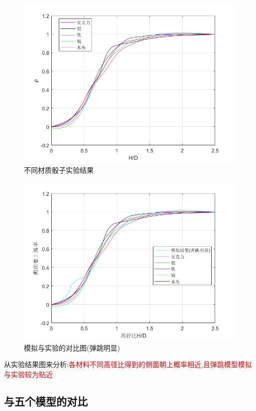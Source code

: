 \documentclass[UTF8]{gapd}
\begin{document}
\begin{figure}[h]%
	\centering
	\includegraphics[width=1\columnwidth]{images/不同材质}
	\caption{不同材质骰子实验结果}
	\label{fig:P2}%
\end{figure}
\begin{figure}[h]%
	\centering
	\includegraphics[width=1\columnwidth]{images/模拟(弹跳)}
	\caption{模拟与实验的对比图(弹跳明显)}
	\label{fig:P2}%
\end{figure}

从实验结果图来分析:\textcolor{red}{各材料不同高径比得到的侧面朝上概率相近,且弹跳模型模拟与实验较为贴近}

\subsection{与五个模型的对比}
\end{document}
